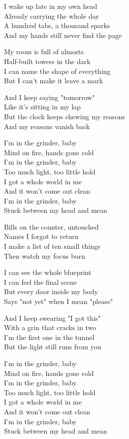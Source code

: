 \begin{lyrics}
I wake up late in my own head\\
Already carrying the whole day\\
A hundred tabs, a thousand sparks\\
And my hands still never find the page

My room is full of almosts\\
Half-built towers in the dark\\
I can name the shape of everything\\
But I can't make it leave a mark

And I keep saying "tomorrow"\\
Like it's sitting in my lap\\
But the clock keeps chewing my reasons\\
And my reasons vanish back

I'm in the grinder, baby\\
Mind on fire, hands gone cold\\
I'm in the grinder, baby\\
Too much light, too little hold\\
I got a whole world in me\\
And it won't come out clean\\
I'm in the grinder, baby\\
Stuck between my head and mean

Bills on the counter, untouched\\
Names I forgot to return\\
I make a list of ten small things\\
Then watch my focus burn

I can see the whole blueprint\\
I can feel the final scene\\
But every door inside my body\\
Says "not yet" when I mean "please"

And I keep swearing "I got this"\\
With a grin that cracks in two\\
I'm the first one in the tunnel\\
But the light still runs from you

I'm in the grinder, baby\\
Mind on fire, hands gone cold\\
I'm in the grinder, baby\\
Too much light, too little hold\\
I got a whole world in me\\
And it won't come out clean\\
I'm in the grinder, baby\\
Stuck between my head and mean


\end{lyrics}
